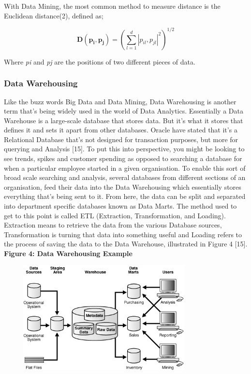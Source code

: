 \documentclass[10pt,journal,compsoc]{IEEEtran}
\begin{document}
With Data Mining, the most common method to measure distance is the Euclidean distance(2), defined as;

\begin{equation}
\mathbf{D(p_{i}, p_{j})} = 
\left(
\sum_{l=1}^{d} |p_{il}, p_{jl}|^2
\right)^{1/2}
\end{equation}

Where \textit{pi} and \textit{pj} are the positions of two different pieces of data.

\subsubsection{Data Warehousing}
Like the buzz words Big Data and Data Mining, Data Warehousing is another term that's being widely used in the world of Data Analytics. Essentially a Data Warehouse is a large-scale database that stores data. But it's what it stores that defines it and sets it apart from other databases. Oracle have stated that it's a Relational Database that's not designed for transaction purposes, but more for querying and Analysis [15]. To put this into perspective, you might be looking to see trends, spikes and customer spending as opposed to searching a database for when a particular employee started in a given organisation. To enable this sort of broad scale searching and analysis, several databases from different sections of an organisation, feed their data into the Data Warehousing which essentially stores everything that's being sent to it. From here, the data can be split and separated into department specific databases known as Data Marts. The method used to get to this point is called ETL (Extraction, Transformation, and Loading). Extraction means to retrieve the data from the various Database sources, Transformation is turning that data into something useful and Loading refers to the process of saving the data to the Data Warehouse, illustrated in Figure 4 [15].\\

\textbf{Figure 4: Data Warehousing Example}
\begin{figure}[ht!]
	\centering
	\includegraphics[width=88mm]{dwarehouse.jpg}
\end{figure}
\end{document}
